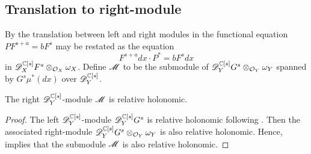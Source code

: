  \subsection{Translation to right-module}
 By the translation between left and right modules in  the functional equation $P F^{s+a} = b F^s$ may be restated as the equation
 $$F^{s+a}dx \cdot P^* = b F^s dx $$
 in $\mathscr{D}_X^{\mathbb{C}[s]} F^s \otimes_{\mathcal{O}_X}\omega_X$.
 Define $\mathscr{M}$ to be the submodule of $ \mathscr{D}_Y^{\mathbb{C}[s]} G^s\otimes_{\mathcal{O}_Y}\omega_Y$ spanned by $G^s \mu^*(dx)$ over $\mathscr{D}_Y^{\mathbb{C}[s]}$.
 \begin{lemma}
   The right $\mathscr{D}_Y^{\mathbb{C}[s]}$-module $\mathscr{M}$ is relative holonomic.
 \end{lemma}
 \begin{proof}
   The left $\mathscr{D}_Y^{\mathbb{C}[s]}$-module $\mathscr{D}_Y^{\mathbb{C}[s]}G^s$ is relative holonomic following \cite[Result 1]{maisonobe2016filtration}.
   Then the associated right-module $\mathscr{D}_Y^{\mathbb{C}[s]}G^s\otimes_{\mathcal{O}_Y} \omega_Y$ is also relative holonomic.
   Hence,  implies that the submodule $\mathscr{M}$ is also relative holonomic.
 \end{proof}
